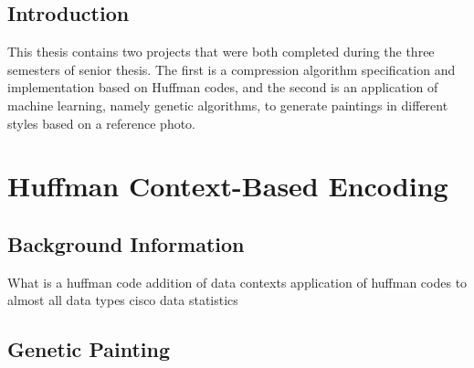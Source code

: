 %
%
\section{Introduction}

This thesis contains two projects that were both completed during the three semesters of senior thesis. The first is a compression algorithm specification and implementation based on Huffman codes, and the second is an application of machine learning, namely genetic algorithms, to generate paintings in different styles based on a reference photo. 

\chapter{Huffman Context-Based Encoding}



\section{Background Information}


What is a huffman code
addition of data contexts
application of huffman codes to almost all data types
cisco data statistics


\section{Genetic Painting}